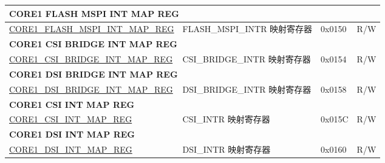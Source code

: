 \begin{longtable}{ | p{7.5cm} | p{7.2cm} | p{1.3cm} | p{1cm} | }
\multicolumn{4}{|l|}{\textbf{CORE1 FLASH MSPI INT MAP REG}} \\ \hline
\hyperref[regdesc:CORE1FLASHMSPIINTMAPREG]{CORE1\_FLASH\_MSPI\_INT\_MAP\_REG} & FLASH\_MSPI\_INTR 映射寄存器 & 0x0150 & R/W \\ \hline
\multicolumn{4}{|l|}{\textbf{CORE1 CSI BRIDGE INT MAP REG}} \\ \hline
\hyperref[regdesc:CORE1CSIBRIDGEINTMAPREG]{CORE1\_CSI\_BRIDGE\_INT\_MAP\_REG} & CSI\_BRIDGE\_INTR 映射寄存器 & 0x0154 & R/W \\ \hline
\multicolumn{4}{|l|}{\textbf{CORE1 DSI BRIDGE INT MAP REG}} \\ \hline
\hyperref[regdesc:CORE1DSIBRIDGEINTMAPREG]{CORE1\_DSI\_BRIDGE\_INT\_MAP\_REG} & DSI\_BRIDGE\_INTR 映射寄存器 & 0x0158 & R/W \\ \hline
\multicolumn{4}{|l|}{\textbf{CORE1 CSI INT MAP REG}} \\ \hline
\hyperref[regdesc:CORE1CSIINTMAPREG]{CORE1\_CSI\_INT\_MAP\_REG} & CSI\_INTR 映射寄存器 & 0x015C & R/W \\ \hline
\multicolumn{4}{|l|}{\textbf{CORE1 DSI INT MAP REG}} \\ \hline
\hyperref[regdesc:CORE1DSIINTMAPREG]{CORE1\_DSI\_INT\_MAP\_REG} & DSI\_INTR 映射寄存器 & 0x0160 & R/W \\ \hline



\end{longtable}
